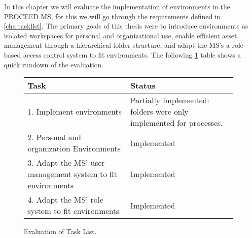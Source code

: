 

In this chapter we will evaluate the implementation of environments in the PROCEED MS,
for this we will go through the requirements defined in \ref{cha:tasklist}.
The primary goals of this thesis were to introduce environments as isolated workspaces for personal and organizational use,
enable efficient asset management through a hierarchical folder structure,
and adapt the MS's a role-based access control system to fit environments.
The following \ref{fig:quick-evaluation} table shows a quick rundown of the evaluation.


\begin{figure}[H]
	\centering

	\begin{tabular}{ | m{20em} | m{17em}| }
		\hline
		 Task & Status \\
     \hline
      1. Implement environments &  Partially implemented: folders were only implemented for processes. \\
     \hline
      2. Personal and organization Environments &  Implemented \\
     \hline
      3. Adapt the MS' user management system to fit environments &  Implemented \\
     \hline
      4. Adapt the MS' role system to fit environments &  Implemented \\
     \hline
	\end{tabular}

	\caption{Evaluation of Task List.}
	\label{fig:quick-evaluation}
\end{figure}

